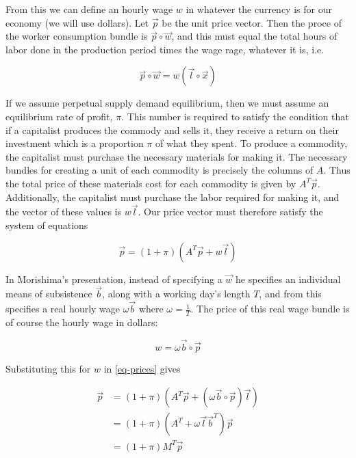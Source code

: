 \documentclass{article}
\theoremstyle{definition}
\begin{document}
From this we can define an hourly wage $w$ in whatever the currency is for our economy (we will use dollars). Let $\vec{p}$ be the unit price vector. Then the proce of the worker consumption bundle is $\vec{p}\circ \vec{w}$, and this must equal the total hours of labor done in the production period times the wage rage, whatever it is, i.e.

\begin{equation}
    \vec{p}\circ \vec{w} = w(\vec{l}\circ \vec{x})
\end{equation}

If we assume perpetual supply demand equilibrium, then we must assume an equilibrium rate of profit, $\pi$. This number is required to satisfy the condition that if a capitalist produces the commody and sells it, they receive a return on their investment which is a proportion $\pi$ of what they spent. To produce a commodity, the capitalist must purchase the necessary materials for making it. The necessary bundles for creating a unit of each commodity is precisely the columns of $A$. Thus the total price of these materials cost for each commodity is given by $A^T\vec{p}$. Additionally, the capitalist must purchase the labor required for making it, and the vector of these values is $w\vec{l}$. Our price vector must therefore satisfy the system of equations

\begin{equation}\label{eq-prices}
    \vec{p} = (1+\pi)(A^T\vec{p}+w\vec{l})
\end{equation}

In Morishima's presentation, instead of specifying a $\vec{w}$ he specifies an individual means of subsistence $\vec{b}$, along with a working day's length $T$, and from this specifies a real hourly wage $\omega \vec{b}$ where $\omega = \frac{1}{T}$. The price of this real wage bundle is of course the hourly wage in dollars:

\begin{equation}
    w = \omega\vec{b}\circ \vec{p}
\end{equation}

Substituting this for $w$ in \ref{eq-prices} gives

\begin{align}
    \vec{p} &= (1+\pi)(A^T\vec{p}+(\omega\vec{b}\circ \vec{p})\vec{l}) \\
            &= (1+\pi)(A^T+\omega\vec{l}\vec{b}^T)\vec{p} \\
            &= (1+\pi)M^T\vec{p}
\end{align}
\end{document}
